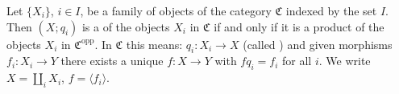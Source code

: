 Let $\{X_i\}$, $i \in I$, be a family of objects of the category $\mathfrak{C}$ indexed by the set $I$. Then $(X; q_i)$ is a  of the objects $X_i$ in $\mathfrak{C}$ if and only if it is a product of the objects $X_i$ in $\mathfrak{C}^{\text{opp}}$. In $\mathfrak{C}$ this means: $q_i: X_i \to X$ (called ) and given morphisms $f_i: X_i \to Y$ there exists a unique $f: X \to Y$ with $f q_i = f_i$ for all $i$. We write $X = \coprod_i X_i$, $f = \langle f_i \rangle$.
